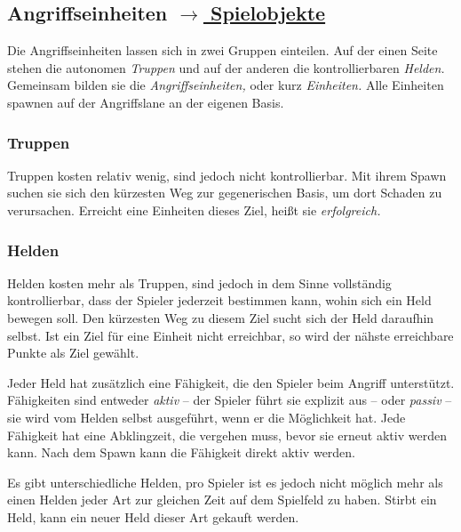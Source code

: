 \subsection[Angriffseinheiten]{Angriffseinheiten \hyperref[sec:attack]{\footnotesize $\rightarrow$ Spielobjekte}}
\label{sec:attack-concept}

Die Angriffseinheiten lassen sich in zwei Gruppen einteilen. Auf der einen
Seite stehen die autonomen \emph{Truppen} und auf der anderen die
kontrollierbaren \emph{Helden.} Gemeinsam bilden sie die
\emph{Angriffseinheiten,} oder kurz \emph{Einheiten.} Alle Einheiten spawnen
auf der Angriffslane an der eigenen Basis.


\subsubsection{Truppen}

Truppen kosten relativ wenig, sind jedoch nicht kontrollierbar. Mit ihrem Spawn
suchen sie sich den kürzesten Weg zur gegenerischen Basis, um dort Schaden zu
verursachen. Erreicht eine Einheiten dieses Ziel, heißt sie \emph{erfolgreich.}


\subsubsection{Helden}

Helden kosten mehr als Truppen, sind jedoch in dem Sinne vollständig
kontrollierbar, dass der Spieler jederzeit bestimmen kann, wohin sich ein Held
bewegen soll. Den kürzesten Weg zu diesem Ziel sucht sich der Held daraufhin
selbst. Ist ein Ziel für eine Einheit nicht erreichbar, so wird der nähste
erreichbare Punkte als Ziel gewählt.

Jeder Held hat zusätzlich eine Fähigkeit, die den Spieler beim Angriff
unterstützt. Fähigkeiten sind entweder \emph{aktiv} -- der Spieler führt sie
explizit aus -- oder \emph{passiv} -- sie wird vom Helden selbst ausgeführt,
wenn er die Möglichkeit hat. Jede Fähigkeit hat eine Abklingzeit, die vergehen
muss, bevor sie erneut aktiv werden kann. Nach dem Spawn kann die Fähigkeit
direkt aktiv werden.

Es gibt unterschiedliche Helden, pro Spieler ist es jedoch nicht möglich mehr
als einen Helden jeder Art zur gleichen Zeit auf dem Spielfeld zu haben.
Stirbt ein Held, kann ein neuer Held dieser Art gekauft werden.
